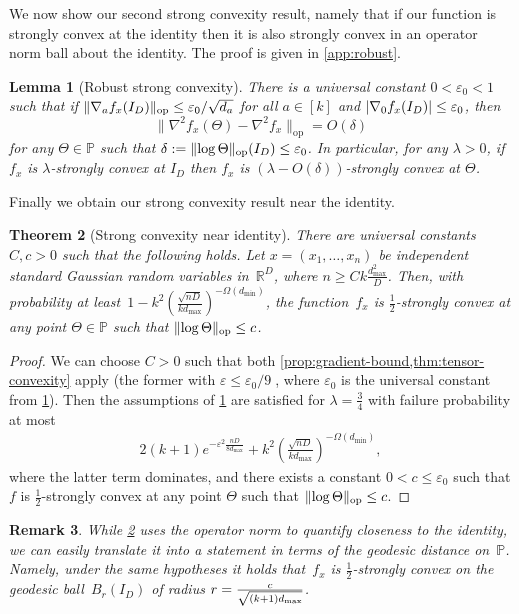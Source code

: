\documentclass[aos]{imsart}
\newtheorem{theorem}{Theorem}[section]
\newtheorem{lemma}[theorem]{Lemma}
\newtheorem{remark}[theorem]{Remark}
\theoremstyle{definition}
\numberwithin{equation}{section}
\DeclareMathOperator{\op}{op}
\DeclarePairedDelimiter{\abs}{\lvert}{\rvert}
\DeclarePairedDelimiter{\norm}{\lVert}{\rVert}
\newcommand{\R}{{\mathbb{R}}}
\renewcommand{\P}{{\mathbb{P}}}
\newcommand{\eps}{\varepsilon}
\newcommand{\samp}{x}
\def\dmax{d_{\max}}
\begin{document}
We now show our second strong convexity result, namely that if our function is strongly convex at the identity then it is also strongly convex in an operator norm ball about the identity.
The proof is given in \cref{app:robust}.

\begin{lemma}[Robust strong convexity]\label{convexRobustness}
There is a universal constant $0 < \eps_0 < 1$ such that if $\norm{\nabla_a f_x(I_D)}_{\op} \leq \eps_0/\sqrt{d_a}$ for all $a\in[k]$ and $\abs{\nabla_{0} f_{\samp}(I_{D})} \leq \eps_0$, then
$$\|\nabla^{2} f_{\samp}(\Theta) - \nabla^{2} f_{\samp}\|_{\op} = O(\delta)$$
for any $\Theta\in\P$ such that $\delta := \norm{\log\Theta}_{\op}(I_D) \leq \eps_0$. In particular, for any $\lambda > 0$, if~$f_x$ is $\lambda$-strongly convex at $I_D$ then $f_x$ is $(\lambda-O(\delta))$-strongly convex at $\Theta$.
\end{lemma}

Finally we obtain our strong convexity result near the identity.

\begin{theorem}[Strong convexity near identity]\label{thm:ball-convexity}
There are universal constants $C,c>0$ such that the following holds.
Let $x = (x_1,\dots,x_n)$ be independent standard Gaussian random variables in~$\R^D$, where $n \geq C k \frac{\dmax^2}D$.
Then, with probability at least~$1 - k^2 ( \frac{\sqrt{nD}}{k \dmax} )^{-\Omega(d_{\min})}$,
the function~$f_x$ is $\frac12$-strongly convex at any point $\Theta\in\P$ such that $\norm{\log\Theta}_{\op} \leq c$.
\end{theorem}
\begin{proof}
We can choose $C>0$ such that both \cref{prop:gradient-bound,thm:tensor-convexity} apply (the former with $\eps\leq\eps_0/9\; $, where $\eps_0$ is the universal constant from \cref{convexRobustness}).
Then the assumptions of \cref{convexRobustness} are satisfied for $\lambda=\frac34$ with failure probability at most
\begin{align*}
  2(k+1)e^{-\eps^2 \frac{nD}{8\dmax}} + k^2 \left( \frac{\sqrt{nD}}{k \dmax} \right)^{-\Omega(d_{\min})},
\end{align*}
where the latter term dominates, and there exists a constant $0<c\leq\eps_0$ such that $f$ is $\frac12$-strongly convex at any point $\Theta$ such that $\norm{\log\Theta}_{\op} \leq c$.
\end{proof}

\begin{remark}\label{remark-strong-convexity-balls}
While \cref{thm:ball-convexity} uses the operator norm to quantify closeness to the identity, we can easily translate it into a statement in terms of the geodesic distance on~$\P$.
Namely, under the same hypotheses it holds that~$f_x$ is $\frac12$-strongly convex on the geodesic ball~$B_r(I_D)$ of radius $r=\smash{\frac c{\sqrt{(k+1)\dmax}}}$.
\end{remark}
\end{document}
